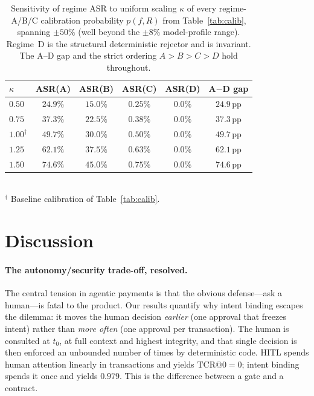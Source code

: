 \documentclass[10pt,twocolumn,letterpaper]{article}
\begin{document}
\begin{table}[h]
\centering
\caption{Sensitivity of regime ASR to uniform scaling $\kappa$ of every regime-A/B/C calibration probability $p(f,R)$ from Table~\ref{tab:calib}, spanning $\pm50\%$ (well beyond the $\pm8\%$ model-profile range). Regime~D is the structural deterministic rejector and is invariant. The A--D gap and the strict ordering $A>B>C>D$ hold throughout.}
\label{tab:sensitivity}
\footnotesize
\begin{tabular}{lccccc}
\toprule
$\kappa$ & ASR(A) & ASR(B) & ASR(C) & ASR(D) & A$-$D gap \\
\midrule
$0.50$            & $24.9\%$ & $15.0\%$ & $0.25\%$ & $0.0\%$ & $24.9$\,pp \\
$0.75$            & $37.3\%$ & $22.5\%$ & $0.38\%$ & $0.0\%$ & $37.3$\,pp \\
$1.00^{\dagger}$  & $49.7\%$ & $30.0\%$ & $0.50\%$ & $0.0\%$ & $49.7$\,pp \\
$1.25$            & $62.1\%$ & $37.5\%$ & $0.63\%$ & $0.0\%$ & $62.1$\,pp \\
$1.50$            & $74.6\%$ & $45.0\%$ & $0.75\%$ & $0.0\%$ & $74.6$\,pp \\
\bottomrule
\end{tabular}
\\[2pt]
{\footnotesize $^{\dagger}$ Baseline calibration of Table~\ref{tab:calib}.}
\end{table}

\section{Discussion}
\label{sec:discussion}

\paragraph{The autonomy/security trade-off, resolved.} The central tension in agentic payments is that the obvious defense---ask a human---is fatal to the product. Our results quantify why intent binding escapes the dilemma: it moves the human decision \emph{earlier} (one approval that freezes intent) rather than \emph{more often} (one approval per transaction). The human is consulted at $t_0$, at full context and highest integrity, and that single decision is then enforced an unbounded number of times by deterministic code. HITL spends human attention linearly in transactions and yields $\mathrm{TCR@0}=0$; intent binding spends it once and yields $0.979$. This is the difference between a gate and a contract.
\end{document}
